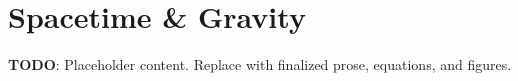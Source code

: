 
\section{Spacetime & Gravity}
\label{sec:spacetime-gravity}

\textbf{TODO}: Placeholder content. Replace with finalized prose, equations, and figures.


